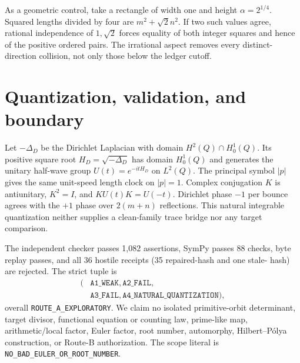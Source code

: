 \documentclass[10pt]{article}
\begin{document}
As a geometric control, take a rectangle of width one and height
$\alpha=2^{1/4}$.  Squared lengths divided by four are
$m^2+\sqrt2n^2$.  If two such values agree, rational independence of
$1,\sqrt2$ forces equality of both integer squares and hence of the positive
ordered pairs.  The irrational aspect removes every distinct-direction
collision, not only those below the ledger cutoff.

\section{Quantization, validation, and boundary}
Let $-\Delta_D$ be the Dirichlet Laplacian with domain
$H^2(Q)\cap H_0^1(Q)$.  Its positive square root
$H_D=\sqrt{-\Delta_D}$ has domain $H_0^1(Q)$ and generates the unitary
half-wave group $U(t)=e^{-itH_D}$ on $L^2(Q)$.  The principal symbol $|p|$
gives the same unit-speed length clock on $|p|=1$.  Complex conjugation $K$
is antiunitary, $K^2=I$, and $KU(t)K=U(-t)$.  Dirichlet phase $-1$ per bounce
agrees with the $+1$ phase over $2(m+n)$ reflections.  This natural integrable
quantization neither supplies a clean-family trace bridge nor any target
comparison.

The independent checker passes 1,082 assertions, SymPy passes 88 checks, byte
replay passes, and all 36 hostile receipts (35 repaired-hash and one stale-
hash) are rejected.  The strict tuple is
\[
\begin{aligned}
(&\texttt{A1\_WEAK},\texttt{A2\_FAIL},\\[-2pt]
 &\texttt{A3\_FAIL},\texttt{A4\_NATURAL\_QUANTIZATION}),
\end{aligned}
\]
overall
\texttt{ROUTE\_A\_EXPLORATORY}.  We claim no isolated primitive-orbit
determinant, target divisor, functional equation or counting law, prime-like
map, arithmetic/local factor, Euler factor, root number, automorphy,
Hilbert--P\'olya construction, or Route-B authorization.  The scope literal is
\texttt{NO\_BAD\_EULER\_OR\_ROOT\_NUMBER}.
\end{document}
